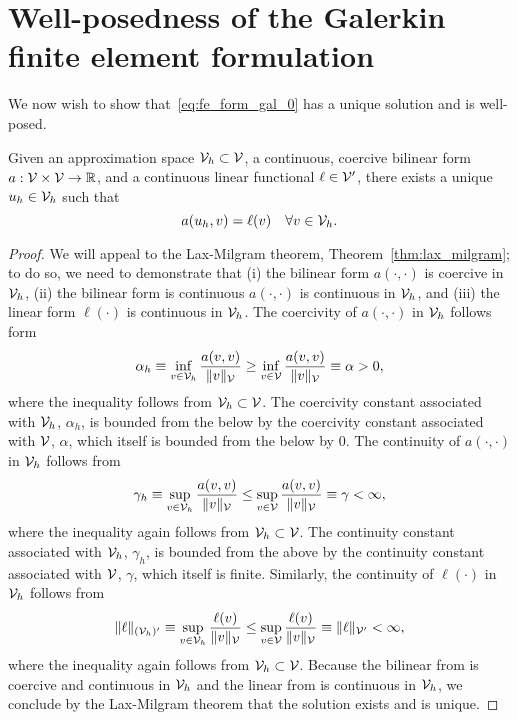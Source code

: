 \section{Well-posedness of the Galerkin finite element formulation}
\label{sec:fe_form_gal_wellposed}
We now wish to show that~\eqref{eq:fe_form_gal_0} has a unique solution and is well-posed.
\begin{proposition}
  \label{prop:fe_form_gal_wellposed}
    Given an approximation space $\mathcal{V}_h \subset \mathcal{V}$, a continuous, coercive bilinear form $a: \mathcal{V} \times \mathcal{V} \to \mathbb{R}$, and a continuous linear functional $\ell \in \mathcal{V}'$, there exists a unique $u_h \in \mathcal{V}_h$ such that
  \begin{equation*}
    a(u_h,v) = \ell(v) \quad \forall v \in \mathcal{V}_h.
  \end{equation*}
  \begin{proof}
We will appeal to the Lax-Milgram theorem, Theorem~\ref{thm:lax_milgram}; to do so, we need to demonstrate that (i) the bilinear form $a(\cdot,\cdot)$ is coercive in $\mathcal{V}_h$, (ii) the bilinear form is continuous $a(\cdot,\cdot)$ is continuous in $\mathcal{V}_h$, and (iii) the linear form $\ell(\cdot)$ is continuous in $\mathcal{V}_h$.  The coercivity of $a(\cdot,\cdot)$ in $\mathcal{V}_h$ follows form
\begin{equation*}
  \alpha_h \equiv \inf_{v \in \mathcal{V}_h} \frac{a(v,v)}{\| v \|_{\mathcal{V}}} \geq
  \inf_{v \in \mathcal{V}} \frac{a(v,v)}{\| v \|_{\mathcal{V}}} \equiv \alpha > 0,
\end{equation*}
where the inequality follows from $\mathcal{V}_h \subset \mathcal{V}$.  The coercivity constant associated with $\mathcal{V}_h$, $\alpha_h$, is bounded from the below by the coercivity constant associated with $\mathcal{V}$, $\alpha$, which itself is bounded from the below by $0$. The continuity of $a(\cdot,\cdot)$ in $\mathcal{V}_h$ follows from
\begin{equation*}
  \gamma_h \equiv \sup_{v \in \mathcal{V}_h} \frac{a(v,v)}{\| v \|_{\mathcal{V}}} \leq
  \sup_{v \in \mathcal{V}} \frac{a(v,v)}{\| v \|_{\mathcal{V}}} \equiv \gamma < \infty,
\end{equation*}
where the inequality again follows from $\mathcal{V}_h \subset \mathcal{V}$.  The continuity constant associated with $\mathcal{V}_h$, $\gamma_h$, is bounded from the above by the continuity constant associated with $\mathcal{V}$, $\gamma$, which itself is finite.  Similarly, the continuity of $\ell(\cdot)$ in $\mathcal{V}_h$ follows from
\begin{equation*}
  \| \ell \|_{(\mathcal{V}_h)'} \equiv \sup_{v \in \mathcal{V}_h} \frac{\ell(v)}{\| v \|_{\mathcal{V}}} \leq \sup_{v \in \mathcal{V}} \frac{\ell(v)}{\| v \|_{\mathcal{V}}} \equiv \| \ell \|_{\mathcal{V}'} < \infty,
\end{equation*}
where the inequality again follows from $\mathcal{V}_h \subset \mathcal{V}$.  Because the bilinear from is coercive and continuous in $\mathcal{V}_h$ and the linear from is continuous in $\mathcal{V}_h$, we conclude by the Lax-Milgram theorem that the solution exists and is unique.
  \end{proof}
\end{proposition}
